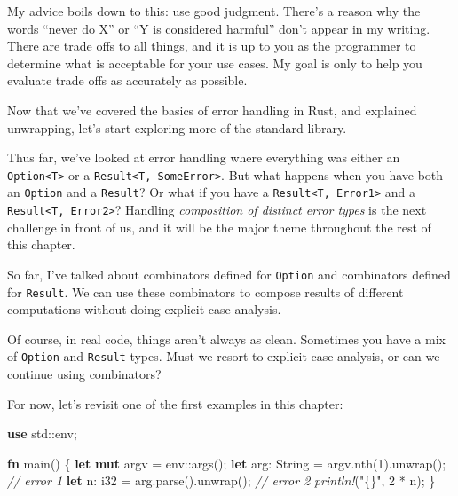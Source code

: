 \documentclass[a4paper,]{book}
\newenvironment{Shaded}{\begin{snugshade}}{\end{snugshade}}
\newcommand{\KeywordTok}[1]{\textcolor[rgb]{0.13,0.29,0.53}{\textbf{{#1}}}}
\newcommand{\DataTypeTok}[1]{\textcolor[rgb]{0.13,0.29,0.53}{{#1}}}
\newcommand{\DecValTok}[1]{\textcolor[rgb]{0.00,0.00,0.81}{{#1}}}
\newcommand{\StringTok}[1]{\textcolor[rgb]{0.31,0.60,0.02}{{#1}}}
\newcommand{\CommentTok}[1]{\textcolor[rgb]{0.56,0.35,0.01}{\textit{{#1}}}}
\newcommand{\PreprocessorTok}[1]{\textcolor[rgb]{0.56,0.35,0.01}{\textit{{#1}}}}
\newcommand{\NormalTok}[1]{{#1}}
\begin{document}
My advice boils down to this: use good judgment. There's a reason why
the words ``never do X'' or ``Y is considered harmful'' don't appear in
my writing. There are trade offs to all things, and it is up to you as
the programmer to determine what is acceptable for your use cases. My
goal is only to help you evaluate trade offs as accurately as possible.

Now that we've covered the basics of error handling in Rust, and
explained unwrapping, let's start exploring more of the standard
library.


Thus far, we've looked at error handling where everything was either an
\texttt{Option\textless{}T\textgreater{}} or a
\texttt{Result\textless{}T,\ SomeError\textgreater{}}. But what happens
when you have both an \texttt{Option} and a \texttt{Result}? Or what if
you have a \texttt{Result\textless{}T,\ Error1\textgreater{}} and a
\texttt{Result\textless{}T,\ Error2\textgreater{}}? Handling
\emph{composition of distinct error types} is the next challenge in
front of us, and it will be the major theme throughout the rest of this
chapter.


So far, I've talked about combinators defined for \texttt{Option} and
combinators defined for \texttt{Result}. We can use these combinators to
compose results of different computations without doing explicit case
analysis.

Of course, in real code, things aren't always as clean. Sometimes you
have a mix of \texttt{Option} and \texttt{Result} types. Must we resort
to explicit case analysis, or can we continue using combinators?

For now, let's revisit one of the first examples in this chapter:

\begin{Shaded}
\begin{Highlighting}[]
\KeywordTok{use} \NormalTok{std::env;}

\KeywordTok{fn} \NormalTok{main() \{}
    \KeywordTok{let} \KeywordTok{mut} \NormalTok{argv = env::args();}
    \KeywordTok{let} \NormalTok{arg: }\DataTypeTok{String} \NormalTok{= argv.nth(}\DecValTok{1}\NormalTok{).unwrap(); }\CommentTok{// error 1}
    \KeywordTok{let} \NormalTok{n: }\DataTypeTok{i32} \NormalTok{= arg.parse().unwrap(); }\CommentTok{// error 2}
    \PreprocessorTok{println!}\NormalTok{(}\StringTok{"\{\}"}\NormalTok{, }\DecValTok{2} \NormalTok{* n);}
\NormalTok{\}}
\end{Highlighting}
\end{Shaded}
\end{document}
